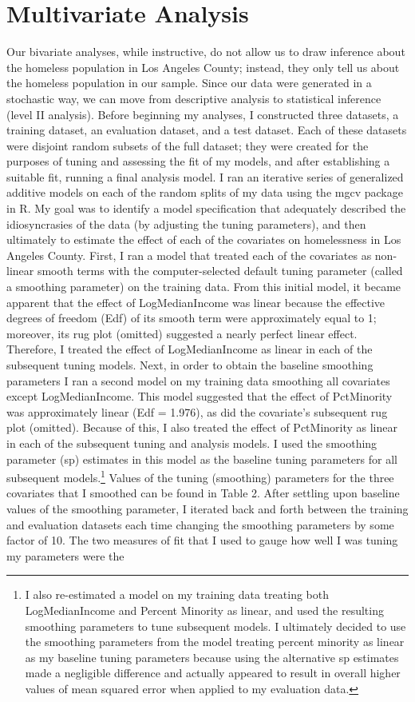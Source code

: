 \documentclass[titlepage]{article}   	%
\begin{document}
\section{Multivariate Analysis}
\indent Our bivariate analyses, while instructive, do not allow us to draw inference about the homeless population in Los Angeles County; instead, they only tell us about the homeless population in our sample. Since our data were generated in a stochastic way, we can move from descriptive analysis to statistical inference (level II analysis). Before beginning my analyses, I constructed three datasets, a training dataset, an evaluation dataset, and a test dataset. Each of these datasets were disjoint random subsets of the full dataset; they were created for the purposes of tuning and assessing the fit of my models, and after establishing a suitable fit, running a final analysis model. I ran an iterative series of generalized additive models on each of the random splits of my data using the mgcv package in R. My goal was to identify a model specification that adequately described the idiosyncrasies of the data (by adjusting the tuning parameters), and then ultimately to estimate the effect of each of the covariates on homelessness in Los Angeles County. First, I ran a model that treated each of the covariates as non-linear smooth terms with the computer-selected default tuning parameter (called a smoothing parameter) on the training data. From this initial model, it became apparent that the effect of LogMedianIncome was linear because the effective degrees of freedom (Edf) of its smooth term were approximately equal to 1; moreover, its rug plot (omitted) suggested a nearly perfect linear effect. Therefore, I treated the effect of LogMedianIncome as linear in each of the subsequent tuning models. Next, in order to obtain the baseline smoothing parameters I ran a second model on my training data smoothing all covariates except LogMedianIncome.  This model suggested that the effect of PctMinority was approximately linear (Edf = 1.976), as did the covariate's subsequent rug plot (omitted). Because of this, I also treated the effect of PctMinority as linear in each of the subsequent tuning and analysis models. I used the smoothing parameter (sp) estimates in this model as the baseline tuning parameters for all subsequent models.\footnote{\label{myfootnote}I also re-estimated a model on my training data treating both LogMedianIncome and Percent Minority as linear, and used the resulting smoothing parameters to tune subsequent models. I ultimately decided to use the smoothing parameters from the model treating percent minority as linear as my baseline tuning parameters because using the alternative sp estimates made a negligible difference and actually appeared to result in overall higher values of mean squared error when applied to my evaluation data.} Values of the tuning (smoothing) parameters for the three covariates that I smoothed can be found in Table 2. After settling upon baseline values of the smoothing parameter, I iterated back and forth between the training and evaluation datasets each time changing the smoothing parameters by some factor of 10. The two measures of fit that I used to gauge how well I was tuning my parameters were the 
\end{document}
